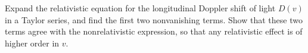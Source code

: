 Expand the relativistic equation for the longitudinal Doppler shift of light
$D(v)$ in a Taylor series, and find the
first two nonvanishing terms. Show that these two terms agree with the
nonrelativistic expression, so that any relativistic effect is of higher
order in $v$.

